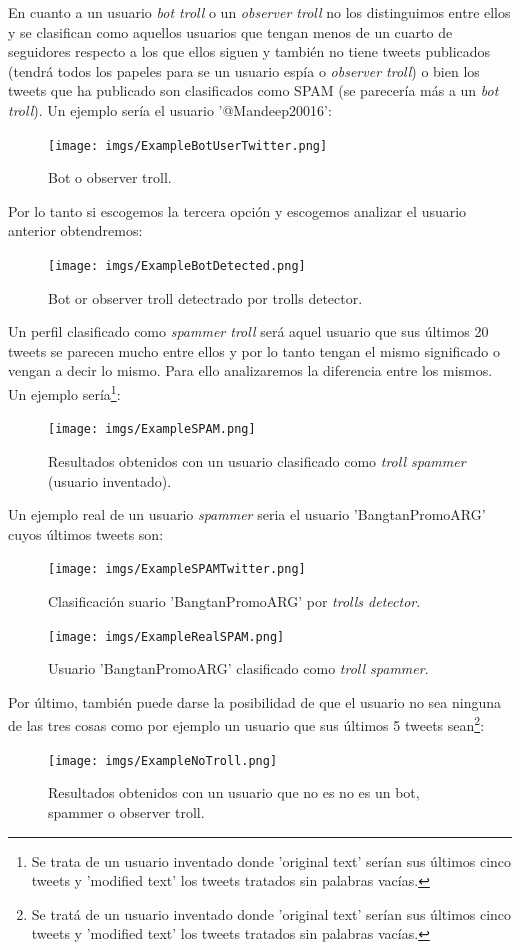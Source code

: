 \documentclass[../all.tex]{subfiles}
\begin{document}
	En cuanto a un usuario \textit{bot troll} o un \textit{observer troll} no los distinguimos entre ellos y se clasifican como aquellos usuarios que tengan menos de un cuarto de seguidores respecto a los que ellos siguen y también no tiene tweets publicados (tendrá todos los papeles para se un usuario espía o \textit{observer troll}) o bien los tweets que ha publicado son clasificados como SPAM (se parecería más a un \textit{bot troll}). Un ejemplo sería el usuario '@Mandeep20016':
	\begin{figure}[H]
		\centering
		\texttt{[image: imgs/ExampleBotUserTwitter.png]}
		\caption{Bot o observer troll.}
	\end{figure}
	Por lo tanto si escogemos la tercera opción y escogemos analizar el usuario anterior obtendremos:
	\begin{figure}[H]
		\centering
		\texttt{[image: imgs/ExampleBotDetected.png]}
		\caption{Bot or observer troll detectrado por trolls detector.}
	\end{figure}
		Un perfil clasificado como \textit{spammer troll} será aquel usuario que sus últimos 20 tweets se parecen mucho entre ellos y por lo tanto tengan el mismo significado o vengan a decir lo mismo. Para ello analizaremos la diferencia entre los mismos. Un ejemplo sería\footnote{Se trata de un usuario inventado donde 'original text' serían sus últimos cinco tweets y 'modified text' los tweets tratados sin palabras vacías.}:
	\begin{figure}[H]
		\centering
		\texttt{[image: imgs/ExampleSPAM.png]}
		\caption{Resultados obtenidos con un usuario clasificado como \textit{troll spammer} (usuario inventado).}
	\end{figure}
	Un ejemplo real de un usuario \textit{spammer} seria el usuario 'BangtanPromoARG' cuyos últimos tweets son:
	\begin{figure}[H]
		\centering
		\texttt{[image: imgs/ExampleSPAMTwitter.png]}
		\caption{Clasificación suario 'BangtanPromoARG' por \textit{trolls detector}.}
	\end{figure}
	\begin{figure}[H]
		\centering
		\texttt{[image: imgs/ExampleRealSPAM.png]}
		\caption{Usuario 'BangtanPromoARG' clasificado como \textit{troll spammer}.}
	\end{figure}
	Por último, también puede darse la posibilidad de que el usuario no sea ninguna de las tres cosas como por ejemplo un usuario que sus últimos 5 tweets sean\footnote{Se tratá de un usuario inventado donde 'original text' serían sus últimos cinco tweets y 'modified text' los tweets tratados sin palabras vacías.}:
	\begin{figure}[H]
		\centering
		\texttt{[image: imgs/ExampleNoTroll.png]}
		\caption{Resultados obtenidos con un usuario que no es no es un bot, spammer o observer troll.}
	\end{figure}
	
\end{document}
